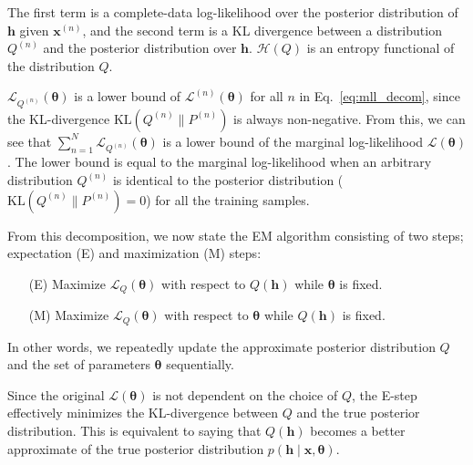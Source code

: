 \documentclass{now}
\newcommand{\vect}[1]{\mathbf{#1}}
\newcommand{\vects}[1]{\boldsymbol{#1}}
\newcommand{\vh}[0]{\vect{h}}
\newcommand{\vx}[0]{\vect{x}}
\newcommand{\TT}[0]{{\vects{\theta}}}
\newcommand{\LL}[0]{\mathcal{L}}
\newcommand{\HH}[0]{\mathcal{H}}
\newcommand{\KL}[0]{\text{KL}}
\begin{document}
The first term is a complete-data log-likelihood over the
posterior distribution of $\vh$ given $\vx^{(n)}$, and the
second term is a KL divergence between a distribution
$Q^{(n)}$ and the posterior distribution over $\vh$.
$\HH(Q)$ is an entropy functional of the distribution $Q$.

$\LL_{Q^{(n)}}(\TT)$ is a lower bound
of $\LL^{(n)}(\TT)$ for all $n$ in Eq.~\eqref{eq:mll_decom},
since the KL-divergence $\KL(Q^{(n)}\| P^{(n)})$ is always
non-negative. From this, 
we can see that
$\sum_{n=1}^N
\LL_{Q^{(n)}}(\TT)$ is a lower bound of the marginal
log-likelihood $\LL(\TT)$. The lower bound is
equal to the marginal log-likelihood when an arbitrary
distribution $Q^{(n)}$ is identical to the posterior distribution
($\KL(Q^{(n)} \| P^{(n)}) = 0$) for all the training
samples.

From this decomposition, we now state the EM algorithm
consisting of two steps; expectation (E) and maximization
(M) steps:
\begin{enumerate}
    \itemsep 0em
    \item[(E)] Maximize $\LL_Q(\TT)$ with respect to $Q(\vh)$
        while $\TT$ is fixed.
    \item[(M)] Maximize $\LL_Q(\TT)$ with respect to $\TT$
        while $Q(\vh)$ is fixed.
\end{enumerate}
In other words, we repeatedly update the approximate
posterior distribution $Q$ and the set of parameters $\TT$
sequentially. 

Since the original $\LL(\TT)$ is not dependent on the choice
of $Q$, the E-step effectively minimizes the KL-divergence
between $Q$ and the true posterior distribution. This is
equivalent to saying that $Q(\vh)$ becomes a better
approximate of the true posterior distribution
$p(\vh\mid\vx,\TT)$.
\end{document}
